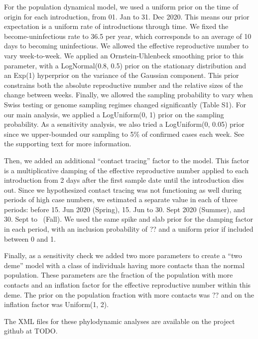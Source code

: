 \documentclass[9pt,twoside,lineno]{pnas-new} %
\begin{document}
For the population dynamical model, we used a uniform prior on the time of origin for each introduction, from 01. Jan to 31. Dec 2020. This means our prior expectation is a uniform rate of introductions through time. We fixed the become-uninfectious rate to 36.5 per year, which corresponds to an average of 10 days to becoming uninfectious. We allowed the effective reproductive number to vary week-to-week. We applied an Ornstein-Uhlenbeck smoothing prior to this parameter, with a LogNormal(0.8, 0.5) prior on the stationary distribution and an Exp(1) hyperprior on the variance of the Gaussian component. This prior constrains both the absolute reproductive number and the relative sizes of the change between weeks. Finally, we allowed the sampling probability to vary when Swiss testing or genome sampling regimes changed significantly (Table S1). For our main analysis, we applied a LogUniform(0, 1) prior on the sampling probability. As a sensitivity analysis, we also tried a LogUniform(0, 0.05) prior since we upper-bounded our sampling to 5\% of confirmed cases each week. See the supporting text for more information.

Then, we added an additional ``contact tracing'' factor to the model. This factor is a multiplicative damping of the effective reproductive number applied to each introduction from 2 days after the first sample date until the introduction dies out. Since we hypothesized contact tracing was not functioning as well during periods of high case numbers, we estimated a separate value in each of three periods: before 15. Jun 2020 (Spring), 15. Jun to 30. Sept 2020 (Summer), and 30. Sept to \maxdate\ (Fall). We used the same spike and slab prior for the damping factor in each period, with an inclusion probability of ?? and a uniform prior if included between 0 and 1. 

Finally, as a sensitivity check we added two more parameters to create a ``two deme'' model with a class of individuals having more contacts than the normal population. These parameters are the fraction of the population with more contacts and an inflation factor for the effective reproductive number within this deme. The prior on the population fraction with more contacts was ?? and on the inflation factor was Uniform(1, 2). 

The XML files for these phylodynamic analyses are available on the project github at TODO.


\showacknow{} %


\end{document}
